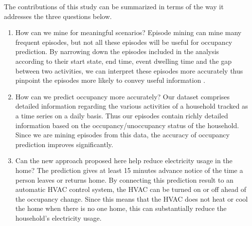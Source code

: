 The contributions of this study can be summarized in terms of the way it addresses the three questions below. 
\begin{enumerate}
\item How can we mine for meaningful scenarios? 
Episode mining can mine many frequent episodes, but not all these episodes will be useful 
for occupancy prediction. 
By narrowing down the episodes included in the analysis according to their start state, 
end time, event dwelling time and the gap between two activities, 
we can interpret these episodes more accurately thus pinpoint the episodes more likely to convey useful information . 
\item How can we predict occupancy more accurately?
Our dataset comprises detailed information regarding the various activities of a household 
tracked as a time series on a daily basis. 
Thus our episodes contain richly detailed information based on the occupancy/unoccupancy status of the household. 
Since we are mining episodes from this data, 
the accuracy of occupancy prediction improves significantly. 
\item  Can the new approach proposed here help reduce electricity usage in the home?
The prediction gives at least 15 minutes advance notice of the time a person 
leaves or returns home. 
By connecting this prediction result to an automatic HVAC control system, the HVAC can be turned on or off  ahead of the occupancy change. 
Since this means that the HVAC does not heat or cool the home when there is no one home, this can substantially reduce the household's electricity usage. 
\end{enumerate}

\iffalse
Next, 
we first discuss the time-gap constraint episode mining 
model and the mixture model, 
and how to predict the target event in section 4. 
Then, 
in section 5 we will show 
the experimental results. 
\fi









